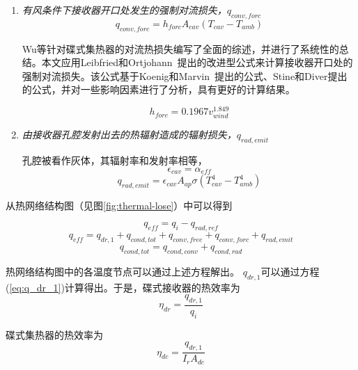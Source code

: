 \begin{enumerate}[label=(\arabic*)]
  \item \emph{有风条件下接收器开口处发生的强制对流损失，$q_{conv,forc}$}  
  \begin{equation}
	q_{conv,forc} = h_{forc}A_{cav}(T_{cav}-T_{amb})
\end{equation}

    Wu等\cite{Wu2010}针对碟式集热器的对流热损失编写了全面的综述，并进行了系统性的总结。本文应用Leibfried和Ortjohann~\cite{Leibfried1995}提出的改进型公式来计算接收器开口处的强制对流损失。该公式基于Koenig和Marvin~\cite{Koenig1981}提出的公式、Stine和Diver\cite{Stine1994}提出的公式，并对一些影响因素进行了分析，具有更好的计算结果。

\begin{equation}
	h_{forc}=0.1967v_{wind}^{1.849}
\end{equation}

  \item \emph{由接收器孔腔发射出去的热辐射造成的辐射损失，$q_{rad,emit}$}
  
  孔腔被看作灰体，其辐射率和发射率相等，
\begin{equation}
    \epsilon_{cav}=\alpha_{eff}
\end{equation}
\begin{equation}
    q_{rad,emit}=\epsilon_{cav}A_{ap}\sigma(T_{cav}^{4}-T_{amb}^{4})
\end{equation}
\end{enumerate}

从热网络结构图（见图\ref{fig:thermal-lose}）中可以得到

\begin{equation}
  q_{eff} = q_i - q_{rad,ref}
\end{equation}
\begin{equation}
  q_{eff} = q_{dr,1} + q_{cond,tot} + q_{conv,free} + q_{conv,forc}+q_{rad,emit}
\end{equation}
\begin{equation}
  q_{cond,tot} = q_{cond,conv}+q_{cond,rad}
\end{equation}


热网络结构图中的各温度节点可以通过上述方程解出。
$q_{dr,1}$可以通过方程(\ref{eq:q_dr_1})计算得出。于是，碟式接收器的热效率为
\begin{equation}
  \eta_{dr} = \frac{q_{dr,1}}{q_i}
\end{equation}

碟式集热器的热效率为
\begin{equation}
  \eta_{dc} = \frac{q_{dr,1}}{I_rA_{dc}}
\end{equation}

